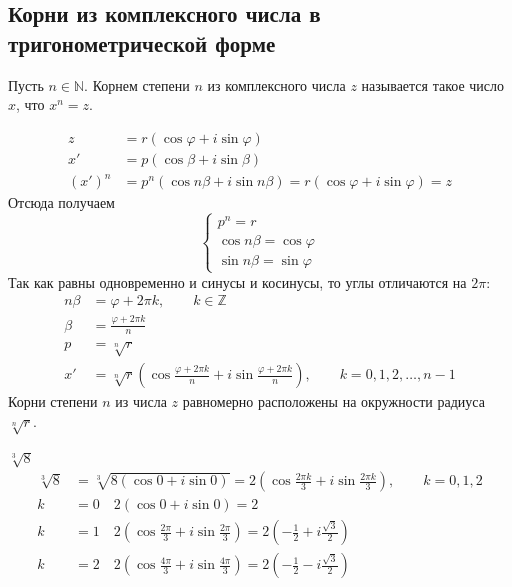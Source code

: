 \documentclass[12pt, a4paper]{article}
\begin{document}
    \subsection{Корни из комплексного числа в тригонометрической форме}
    \begin{definition}
        Пусть \( n \in \mathbb{N} \). Корнем степени \( n \) из комплексного числа \( z \) называется такое число \( x \), что \( x^{n} = z  \).
    \end{definition}
    \begin{align*}
        z &= r(\cos \varphi + i \sin \varphi) \\
        x' &= p(\cos \beta + i \sin \beta) \\
        (x')^{n} &= p^{n}(\cos n\beta + i \sin n\beta) = r (\cos \varphi + i \sin \varphi) = z
    \end{align*}
    Отсюда получаем \[
        \begin{cases}
            p^{n} = r \\
            \cos n\beta = \cos \varphi\\
            \sin n\beta = \sin \varphi
        \end{cases}
    \] 
    Так как равны одновременно и синусы и косинусы, то углы отличаются на \( 2 \pi \):
    \begin{align*}
        n\beta &= \varphi + 2 \pi k, \qquad k \in \mathbb{Z}\\
        \beta &= \frac{\varphi + 2 \pi k}{n}\\
        p &= \sqrt[n]{r} \\
        x' &= \sqrt[n]{r}\left( \cos \frac{\varphi + 2 \pi k}{n} + i \sin \frac{\varphi + 2 \pi k}{n} \right) , \qquad k = 0, 1, 2, \ldots , n -1 
    \end{align*}
    Корни степени \( n \) из числа \( z \) равномерно расположены на окружности радиуса \( \sqrt[n]{r}  \).
    \begin{exmp}
        \( \sqrt[3]{8}  \)
        \begin{align*}
            \sqrt[3]{8} &= \sqrt[3]{8(\cos 0 + i \sin 0)} = 2 \left( \cos \frac{2 \pi k}{3} + i \sin \frac{2 \pi k}{3} \right), \qquad k = 0, 1, 2 \\
            k &= 0 \quad 2\left( \cos 0 + i \sin 0 \right) = 2 \\
            k &= 1 \quad 2\left( \cos \frac{2 \pi }{3} + i \sin \frac{2 \pi }{3}\right) = 2\left(- \frac{1}{2} + i \frac{\sqrt{3} }{2}\right)  \\
            k &= 2 \quad 2\left( \cos \frac{4 \pi }{3} + i \sin \frac{4 \pi }{3}\right) = 2\left(- \frac{1}{2} - i \frac{\sqrt{3} }{2}\right)  
        \end{align*}
        
    \end{exmp}
\end{document}
